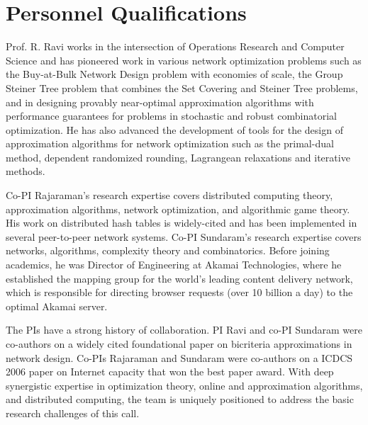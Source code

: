 \section{Personnel Qualifications}

Prof. R. Ravi works in the intersection of Operations Research and
Computer Science and has pioneered work in various network
optimization problems such as the Buy-at-Bulk Network Design problem
with economies of scale, the Group Steiner Tree problem that combines
the Set Covering and Steiner Tree problems, and in designing provably
near-optimal approximation algorithms with performance guarantees for
problems in stochastic and robust combinatorial optimization. He has
also advanced the development of tools for the design of approximation
algorithms for network optimization such as the primal-dual method,
dependent randomized rounding, Lagrangean relaxations and iterative
methods.

Co-PI Rajaraman's research expertise covers distributed computing
theory, approximation algorithms, network optimization, and
algorithmic game theory.  His work on distributed hash tables is
widely-cited and has been implemented in several peer-to-peer network
systems.  Co-PI Sundaram's research expertise covers networks,
algorithms, complexity theory and combinatorics.  Before joining
academics, he was Director of Engineering at Akamai Technologies,
where he established the mapping group for the world's leading content
delivery network, which is responsible for directing browser requests
(over 10 billion a day) to the optimal Akamai server.

The PIs have a strong history of collaboration.  PI Ravi and co-PI
Sundaram were co-authors on a widely cited foundational paper on
bicriteria approximations in network design.  Co-PIs Rajaraman and
Sundaram were co-authors on a ICDCS 2006 paper on Internet capacity
that won the best paper award.  With deep synergistic expertise in
optimization theory, online and approximation algorithms, and
distributed computing, the team is uniquely positioned to address the
basic research challenges of this call.



